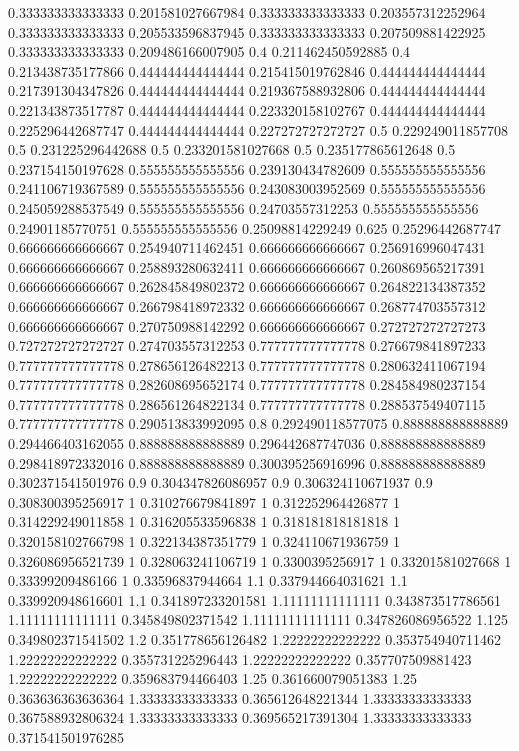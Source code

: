 {0.333333333333333 0.201581027667984
0.333333333333333 0.203557312252964
0.333333333333333 0.205533596837945
0.333333333333333 0.207509881422925
0.333333333333333 0.209486166007905
0.4 0.211462450592885
0.4 0.213438735177866
0.444444444444444 0.215415019762846
0.444444444444444 0.217391304347826
0.444444444444444 0.219367588932806
0.444444444444444 0.221343873517787
0.444444444444444 0.223320158102767
0.444444444444444 0.225296442687747
0.444444444444444 0.227272727272727
0.5 0.229249011857708
0.5 0.231225296442688
0.5 0.233201581027668
0.5 0.235177865612648
0.5 0.237154150197628
0.555555555555556 0.239130434782609
0.555555555555556 0.241106719367589
0.555555555555556 0.243083003952569
0.555555555555556 0.245059288537549
0.555555555555556 0.24703557312253
0.555555555555556 0.24901185770751
0.555555555555556 0.25098814229249
0.625 0.25296442687747
0.666666666666667 0.254940711462451
0.666666666666667 0.256916996047431
0.666666666666667 0.258893280632411
0.666666666666667 0.260869565217391
0.666666666666667 0.262845849802372
0.666666666666667 0.264822134387352
0.666666666666667 0.266798418972332
0.666666666666667 0.268774703557312
0.666666666666667 0.270750988142292
0.666666666666667 0.272727272727273
0.727272727272727 0.274703557312253
0.777777777777778 0.276679841897233
0.777777777777778 0.278656126482213
0.777777777777778 0.280632411067194
0.777777777777778 0.282608695652174
0.777777777777778 0.284584980237154
0.777777777777778 0.286561264822134
0.777777777777778 0.288537549407115
0.777777777777778 0.290513833992095
0.8 0.292490118577075
0.888888888888889 0.294466403162055
0.888888888888889 0.296442687747036
0.888888888888889 0.298418972332016
0.888888888888889 0.300395256916996
0.888888888888889 0.302371541501976
0.9 0.304347826086957
0.9 0.306324110671937
0.9 0.308300395256917
1 0.310276679841897
1 0.312252964426877
1 0.314229249011858
1 0.316205533596838
1 0.318181818181818
1 0.320158102766798
1 0.322134387351779
1 0.324110671936759
1 0.326086956521739
1 0.328063241106719
1 0.3300395256917
1 0.33201581027668
1 0.33399209486166
1 0.33596837944664
1.1 0.337944664031621
1.1 0.339920948616601
1.1 0.341897233201581
1.11111111111111 0.343873517786561
1.11111111111111 0.345849802371542
1.11111111111111 0.347826086956522
1.125 0.349802371541502
1.2 0.351778656126482
1.22222222222222 0.353754940711462
1.22222222222222 0.355731225296443
1.22222222222222 0.357707509881423
1.22222222222222 0.359683794466403
1.25 0.361660079051383
1.25 0.363636363636364
1.33333333333333 0.365612648221344
1.33333333333333 0.367588932806324
1.33333333333333 0.369565217391304
1.33333333333333 0.371541501976285
}
